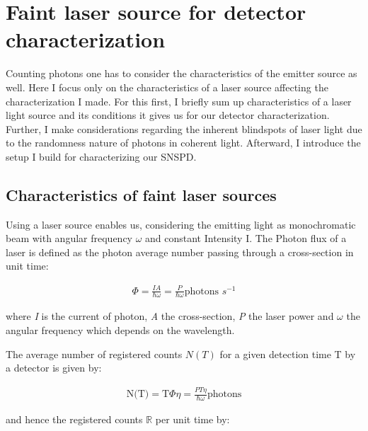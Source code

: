 
\chapter{Faint laser source for detector characterization}
\label{sec:SNSPD_setup}

Counting photons one has to consider the characteristics of the emitter source as well.
Here I focus only on the characteristics of a laser source affecting the characterization I made.
For this first, I briefly sum up characteristics of a laser light source and its conditions it gives us for our detector
characterization.
Further, I make considerations regarding the inherent blindspots of laser light due to the randomness nature of photons
in coherent light.
Afterward, I introduce the setup I build for characterizing our SNSPD.\\

\section{Characteristics of faint laser sources}\label{sec:characteristics_faint laser sources}

Using a laser source enables us, considering the emitting light as monochromatic beam with angular frequency $\omega$
and constant Intensity I. The Photon flux of a laser is defined as the photon average number passing through
a cross-section in unit time:

\begin{align}
    \Phi = \frac{I A}{\hbar \omega} = \frac{P}{\hbar \omega} \text{photons $s^{-1}$}
\end{align}

where \textit{I} is the current of photon, \textit{A} the cross-section, \textit{P} the laser power and $\omega$ the angular frequency which
depends on the wavelength.

The average number of registered counts $N(T)$ for a given detection time T by a detector is given by:

\begin{align}
    \text{N(T)} = \text{T} \Phi \eta= \frac{P T \eta}{\hbar \omega} \text{photons}
\end{align}

and hence the registered counts $\mathbb{R}$ per unit time by:


